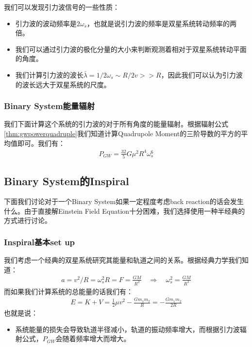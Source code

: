 \bigskip
{}

我们可以发现引力波信号的一些性质：
\begin{itemize}
  \item 引力波的波动频率是$ 2 \omega_s $，也就是说引力波的频率是双星系统转动频率的两倍。
  \item 我们可以通过引力波的极化分量的大小来判断观测着相对于双星系统转动平面的角度。
  \item 我们计算引力波的波长$ \bar{\lambda} = 1/2 \omega_s \sim R/2v >> R
    $，因此我们可以认为引力波的波长远大于双星系统的尺度。
\end{itemize}

\subsubsection{Binary System能量辐射}

我们下面计算这个系统的引力波的对于所有角度的能量辐射。根据辐射公式\cref{thm:gwpowerquadruple}我们知道计算Quadrupole
Moment的三阶导数的平方的平均值即可。我们有：
\begin{align}
  P_{GW} = \displaystyle\frac{32}{5} G \mu^2 R^4 \omega_s^6
\end{align}

\subsection{Binary System的Inspiral}

下面我们讨论对于一个Binary System如果一定程度考虑back reaction的话会发生什么。由于直接解Einstein
Field Equation十分困难，我们选择使用一种半经典的方式进行讨论。

\subsubsection{Inspiral基本set up}

\bigskip
{}

我们考虑一个经典的双星系统研究其能量和轨道之间的关系。根据经典力学我们知道：
\begin{align}
  a = v^2/R = \omega_s^2 R = F= \displaystyle\frac{GM}{R^2} \quad
  \Rightarrow \quad \omega_s^2 = \displaystyle\frac{GM}{R^3}
\end{align}
而如果我们计算系统的总能量的话我们有：
\begin{align}
  E = K + V = \displaystyle\frac{1}{2} \mu v^2 - \displaystyle\frac{G
  m_1 m_2}{R} = - \displaystyle\frac{G m_1 m_2}{2R}
\end{align}
也就是说：
\begin{itemize}
  \item 系统能量的损失会导致轨道半径减小，轨道的振动频率增大，而根据引力波辐射公式，$ P_{GW} $会随着频率增大而增大。
\end{itemize}

